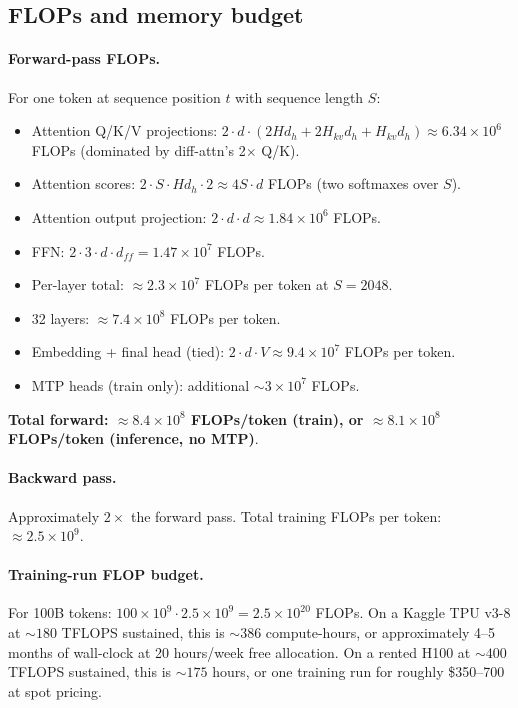 \documentclass[11pt,a4paper]{article}
\theoremstyle{definition}
\theoremstyle{remark}
\begin{document}
\subsection{FLOPs and memory budget}
\label{sec:budget}

\paragraph{Forward-pass FLOPs.} For one token at sequence position $t$
with sequence length $S$:
\begin{itemize}[leftmargin=1.5em,itemsep=0.2em]
    \item Attention Q/K/V projections:
          $2 \cdot d \cdot (2 H d_h + 2 H_{kv} d_h + H_{kv} d_h) \approx
          6.34 \times 10^6$ FLOPs (dominated by diff-attn's 2$\times$ Q/K).
    \item Attention scores:
          $2 \cdot S \cdot H d_h \cdot 2 \approx 4 S \cdot d$ FLOPs
          (two softmaxes over $S$).
    \item Attention output projection: $2 \cdot d \cdot d \approx
          1.84 \times 10^6$ FLOPs.
    \item FFN: $2 \cdot 3 \cdot d \cdot d_{ff} = 1.47 \times 10^7$ FLOPs.
    \item Per-layer total: $\approx 2.3 \times 10^7$ FLOPs per token
          at $S = 2048$.
    \item 32 layers: $\approx 7.4 \times 10^8$ FLOPs per token.
    \item Embedding + final head (tied): $2 \cdot d \cdot V \approx
          9.4 \times 10^7$ FLOPs per token.
    \item MTP heads (train only): additional $\sim 3 \times 10^7$ FLOPs.
\end{itemize}
\textbf{Total forward: $\approx 8.4 \times 10^8$ FLOPs/token (train), or
$\approx 8.1 \times 10^8$ FLOPs/token (inference, no MTP)}.

\paragraph{Backward pass.} Approximately $2 \times$ the forward pass.
Total training FLOPs per token: $\approx 2.5 \times 10^9$.

\paragraph{Training-run FLOP budget.} For 100B tokens:
$100 \times 10^9 \cdot 2.5 \times 10^9 = 2.5 \times 10^{20}$ FLOPs.
On a Kaggle TPU v3-8 at $\sim 180$ TFLOPS sustained, this is
$\sim 386$ compute-hours, or approximately 4--5 months of wall-clock at
20 hours/week free allocation. On a rented H100 at $\sim 400$ TFLOPS
sustained, this is $\sim 175$ hours, or one training run for roughly
\$350--700 at spot pricing.
\end{document}

